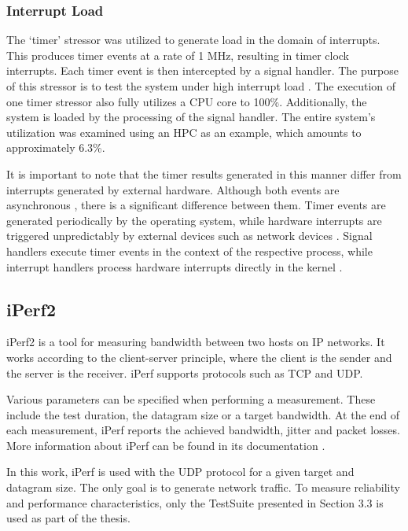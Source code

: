 \subsubsection{Interrupt Load} \label{chap:stressngInterrupt}
The `timer' stressor was utilized to generate load in the domain of interrupts. This produces timer events at a rate of 1 MHz, resulting in timer clock interrupts. Each timer event is then intercepted by a signal handler. The purpose of this stressor is to test the system under high interrupt load \cite{stress02}. The execution of one timer stressor also fully utilizes a CPU core to 100\%. Additionally, the system is loaded by the processing of the signal handler. The entire system's utilization was examined using an HPC as an example, which amounts to approximately 6.3\%.

It is important to note that the timer results generated in this manner differ from interrupts generated by external hardware. Although both events are asynchronous \cite{like02}, there is a significant difference between them. Timer events are generated periodically by the operating system, while hardware interrupts are triggered unpredictably by external devices such as network devices \cite{stress14}. Signal handlers execute timer events in the context of the respective process, while interrupt handlers process hardware interrupts directly in the kernel \cite{like02}.




\subsection{iPerf2}
iPerf2 is a tool for measuring bandwidth between two hosts on IP networks. It works according to the client-server principle, where the client is the sender and the server is the receiver. iPerf supports protocols such as TCP and UDP.

Various parameters can be specified when performing a measurement. These include the test duration, the datagram size or a target bandwidth. At the end of each measurement, iPerf reports the achieved bandwidth, jitter and packet losses. More information about iPerf can be found in its documentation \cite{testsuite01}.

In this work, iPerf is used with the UDP protocol for a given target and datagram size. The only goal is to generate network traffic. To measure reliability and performance characteristics, only the TestSuite presented in Section 3.3 is used as part of the thesis.